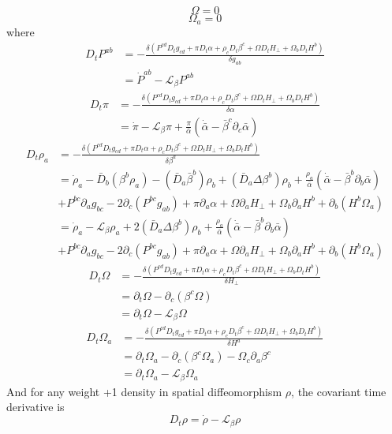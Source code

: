 \documentclass{article}
\begin{document}
\[
\Omega = 0
\]
\[
\Omega_{a} = 0
\]
where
\begin{align*}
D_{t}P^{ab} & = -\frac{\delta \left(P^{cd}D_{t}g_{cd} + \pi D_{t}\alpha + \rho_{c} D_{t}\beta^{c} + \Omega D_{t}H_{\perp} + \Omega_{b}D_{t}H^{b}\right)}{\delta g_{ab}}\\
&  = {\dot P}^{ab} - \mathscr{L}_{\beta}P^{ab}
\end{align*}
\begin{align*}
D_{t}\pi & = -\frac{\delta \left(P^{cd} D_{t}g_{cd} + \pi D_{t}\alpha + \rho_{c} D_{t}\beta^{c}+ \Omega D_{t}H_{\perp} + \Omega_{b}D_{t}H^{b} \right)}{\delta \alpha}\\
&  = {\dot \pi} - \mathscr{L}_{\beta}\pi + \frac{\pi}{{\bar \alpha}}\left({\dot {\bar \alpha}} - {\bar \beta}^{c}\partial_{c}{\bar \alpha}\right)
\end{align*}
\begin{align*}
D_{t}\rho_{a} & = -\frac{\delta \left(P^{cd} D_{t}g_{cd} + \pi D_{t}\alpha + \rho_{c} D_{t}\beta^{c} + \Omega D_{t}H_{\perp} + \Omega_{b}D_{t}H^{b}\right)}{\delta \beta^{a}}\\
& = {\dot \rho}_{a} - {\bar D}_{b}\left(\beta^{b}\rho_{a}\right) - \left({\bar D}_{a}{\bar \beta}^{b}\right)\rho_{b}  + \left({\bar D}_{a}\Delta \beta^{b}\right)\rho_{b} + \frac{\rho_{a}}{{\bar \alpha}}\left({\dot {\bar \alpha}} - {\bar \beta}^{b}\partial_{b}{\bar \alpha}\right)\\
& + P^{bc}\partial_{a}g_{bc} - 2\partial_{c}\left(P^{bc}g_{ab}\right) + \pi \partial_{a}\alpha  + \Omega\partial_{a}H_{\perp} + \Omega_{b}\partial_{a}H^{b} + \partial_{b}\left(H^{b}\Omega_{a}\right)\\
& = {\dot \rho}_{a} - \mathscr{L}_{\beta}\rho_{a}  + 2\left({\bar D}_{a}\Delta \beta^{b}\right)\rho_{b} + \frac{\rho_{a}}{{\bar \alpha}}\left({\dot {\bar \alpha}} - {\bar \beta}^{b}\partial_{b}{\bar \alpha}\right)\\
& + P^{bc}\partial_{a}g_{bc} - 2\partial_{c}\left(P^{bc}g_{ab}\right) + \pi \partial_{a}\alpha + \Omega\partial_{a}H_{\perp} + \Omega_{b}\partial_{a}H^{b} + \partial_{b}\left(H^{b}\Omega_{a}\right)
\end{align*}
\begin{align*}
D_{t}\Omega &= -\frac{\delta \left(P^{cd} D_{t}g_{cd} + \pi D_{t}\alpha + \rho_{c} D_{t}\beta^{c} + \Omega D_{t}H_{\perp} + \Omega_{b}D_{t}H^{b}\right)}{\delta H_{\perp}}\\
& = \partial_{t}\Omega - \partial_{c}\left(\beta^{c}\Omega\right)\\
& = \partial_{t}\Omega - \mathscr{L}_{\beta}\Omega
\end{align*}
\begin{align*}
D_{t}\Omega_{a} & = -\frac{\delta \left(P^{cd} D_{t}g_{cd} + \pi D_{t}\alpha + \rho_{c} D_{t}\beta^{c} + \Omega D_{t}H_{\perp} + \Omega_{b}D_{t}H^{b}\right)}{\delta H^{a}}\\
& = \partial_{t}\Omega_{a} - \partial_{c}\left(\beta^{c}\Omega_{a}\right) - \Omega_{c}\partial_{a}\beta^{c}\\
& = \partial_{t}\Omega_{a} - \mathscr{L}_{\beta}\Omega_{a}
\end{align*}
And for any weight +1 density in spatial diffeomorphism $\rho$, the covariant time derivative is
\[
D_{t}\rho = {\dot \rho} - \mathscr{L}_{\beta}\rho
\]
\end{document}
